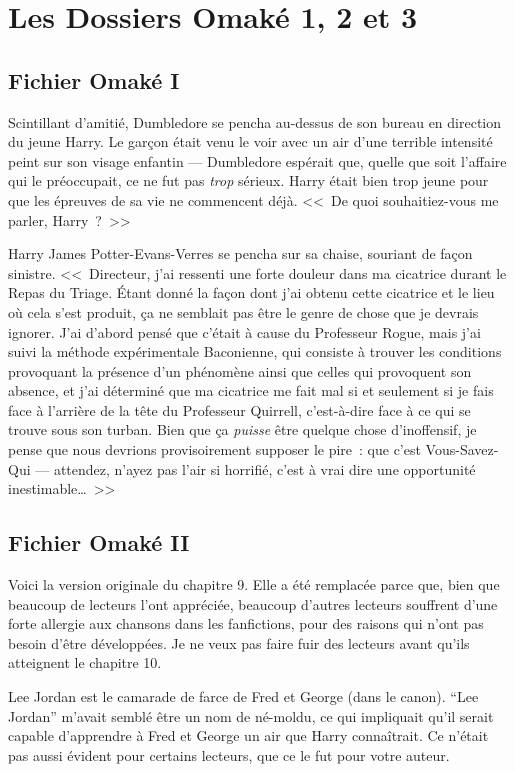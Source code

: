 \chapter{Les Dossiers Omaké 1, 2 et 3}

\section{Fichier Omaké I}

Scintillant d'amitié, Dumbledore se pencha au-dessus de son bureau en direction du jeune Harry. Le garçon était venu le voir avec un air d'une terrible intensité peint sur son visage enfantin — Dumbledore espérait que, quelle que soit l'affaire qui le préoccupait, ce ne fut pas \emph{trop} sérieux. Harry était bien trop jeune pour que les épreuves de sa vie ne commencent déjà. <<~De quoi souhaitiez-vous me parler, Harry~?~>>

Harry James Potter-Evans-Verres se pencha sur sa chaise, souriant de façon sinistre. <<~Directeur, j'ai ressenti une forte douleur dans ma cicatrice durant le Repas du Triage. Étant donné la façon dont j'ai obtenu cette cicatrice et le lieu où cela s'est produit, ça ne semblait pas être le genre de chose que je devrais ignorer. J'ai d'abord pensé que c'était à cause du Professeur Rogue, mais j'ai suivi la méthode expérimentale Baconienne, qui consiste à trouver les conditions provoquant la présence d'un phénomène ainsi que celles qui provoquent son absence, et j'ai déterminé que ma cicatrice me fait mal si et seulement si je fais face à l'arrière de la tête du Professeur Quirrell, c'est-à-dire face à ce qui se trouve sous son turban. Bien que ça \emph{puisse} être quelque chose d'inoffensif, je pense que nous devrions provisoirement supposer le pire~: que c'est Vous-Savez-Qui — attendez, n'ayez pas l'air si horrifié, c'est à vrai dire une opportunité inestimable…~>>

\section{Fichier Omaké II}

Voici la version originale du chapitre 9. Elle a été remplacée parce que, bien que beaucoup de lecteurs l'ont appréciée, beaucoup d'autres lecteurs souffrent d'une forte allergie aux chansons dans les fanfictions, pour des raisons qui n'ont pas besoin d'être développées. Je ne veux pas faire fuir des lecteurs avant qu'ils atteignent le chapitre 10.

Lee Jordan est le camarade de farce de Fred et George (dans le canon). “Lee Jordan” m'avait semblé être un nom de né-moldu, ce qui impliquait qu'il serait capable d'apprendre à Fred et George un air que Harry connaîtrait. Ce n'était pas aussi évident pour certains lecteurs, que ce le fut pour votre auteur.

